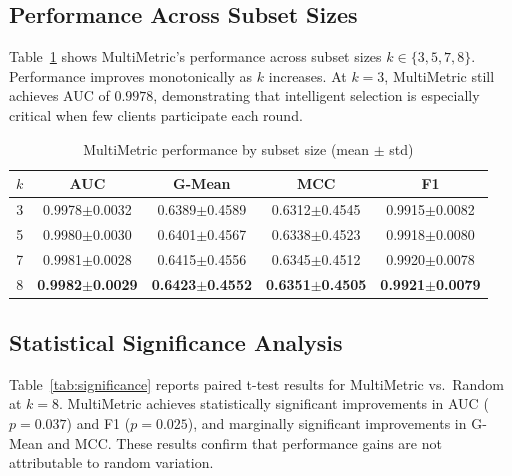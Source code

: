 \subsection{Performance Across Subset Sizes}

Table~\ref{tab:subsets} shows MultiMetric's performance across subset sizes $k \in \{3, 5, 7, 8\}$. Performance improves monotonically as $k$ increases. At $k=3$, MultiMetric still achieves AUC of $0.9978$, demonstrating that intelligent selection is especially critical when few clients participate each round.

\begin{table}[htbp]
\centering
\caption{MultiMetric performance by subset size (mean $\pm$ std)}
\label{tab:subsets}
\begin{tabular}{|c|c|c|c|c|}
\hline
\textbf{$k$} & \textbf{AUC} & \textbf{G-Mean} & \textbf{MCC} & \textbf{F1} \\
\hline
3 & 0.9978$\pm$0.0032 & 0.6389$\pm$0.4589 & 0.6312$\pm$0.4545 & 0.9915$\pm$0.0082 \\
5 & 0.9980$\pm$0.0030 & 0.6401$\pm$0.4567 & 0.6338$\pm$0.4523 & 0.9918$\pm$0.0080 \\
7 & 0.9981$\pm$0.0028 & 0.6415$\pm$0.4556 & 0.6345$\pm$0.4512 & 0.9920$\pm$0.0078 \\
8 & \textbf{0.9982$\pm$0.0029} & \textbf{0.6423$\pm$0.4552} & \textbf{0.6351$\pm$0.4505} & \textbf{0.9921$\pm$0.0079} \\
\hline
\end{tabular}
\end{table}

\subsection{Statistical Significance Analysis}

Table~\ref{tab:significance} reports paired t-test results for MultiMetric vs.\ Random at $k=8$. MultiMetric achieves statistically significant improvements in AUC ($p=0.037$) and F1 ($p=0.025$), and marginally significant improvements in G-Mean and MCC. These results confirm that performance gains are not attributable to random variation.


